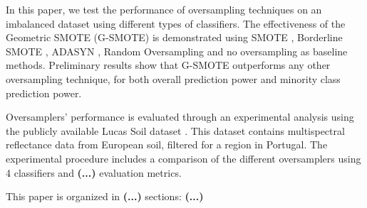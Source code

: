 \documentclass[parskip=full]{scrartcl}
\begin{document}
In this paper, we test the performance of oversampling techniques on an imbalanced dataset using different types of classifiers. The effectiveness of the Geometric SMOTE (G-SMOTE) \cite{Douzas2019} is demonstrated using SMOTE \cite{Chawla2002}, Borderline SMOTE \cite{Han2005}, ADASYN \cite{HaiboHe2008}, Random Oversampling and no oversampling as baseline methods. Preliminary results show that G-SMOTE outperforms any other oversampling technique, for both overall prediction power and minority class prediction power.

Oversamplers' performance is evaluated through an experimental analysis using the publicly available Lucas Soil dataset \cite{Toth2013}. This dataset contains multispectral reflectance data from European soil, filtered for a region in Portugal. The experimental procedure includes a comparison of the different oversamplers using 4 classifiers and \textbf{(...)} evaluation metrics.

This paper is organized in \textbf{(...)} sections: \textbf{(...)}





\end{document}
